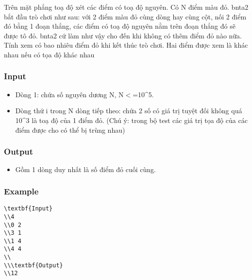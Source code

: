 



   Trên mặt phẳng toạ độ xét các điểm có toạ độ nguyên. Có N điểm màu đỏ. bnta2 bắt đầu trò chơi như sau: với 2 điểm màu đỏ cùng dòng hay cùng cột, nối 2 điểm đó bằng 1 đoạn thẳng, các điểm có toạ độ nguyên nằm trên đoạn thẳng đó sẽ được tô đỏ. bnta2 cứ làm như vậy cho đến khi không có thêm điểm đỏ nào nữa.   Tính xem có bao nhiêu điểm đỏ khi kết thúc trò chơi. Hai điểm được xem là khác nhau nếu có tọa độ khác nhau  

\subsubsection{   Input  }
\begin{itemize}
	\item     Dòng 1: chứa số nguyên dương N, N$<$=10\textasciicircum5.   
	\item     Dòng thứ i trong N dòng tiếp theo: chứa 2 số có giá trị tuyệt đối không quá 10\textasciicircum3 là toạ độ của 1 điểm đỏ. (Chú ý: trong bộ test các giá trị tọa độ của các điểm được cho có thể bị trùng nhau)   
\end{itemize}

\subsubsection{   Output  }
\begin{itemize}
	\item     Gồm 1 dòng duy nhất là số điểm đỏ cuối cùng.   
\end{itemize}

\subsubsection{   Example  }
\begin{verbatim}
\textbf{Input}
\\4 
\\0 2 
\\3 1 
\\1 4 
\\4 4 
\\
\\\textbf{Output}
\\12\end{verbatim}